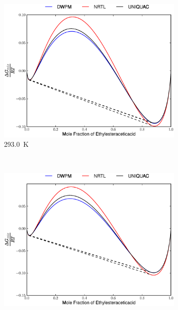 \vspace*{\fill}
\clearpage
\vspace*{\fill}
\begin{figure}[hp]
\ContinuedFloat 
\begin{subfigure}[h]{0.5\textwidth}
	\centering
	\includegraphics[width = \textwidth]{Results_Parts/BinaryParams/ethylesteraceticacid-water/AllModelsGibbsPlots/T_293.0.eps}
	\caption{293.0~$\mathrm{K}$}
\end{subfigure}%
~%
\begin{subfigure}[h]{0.5\textwidth}
	\centering
	\includegraphics[width = \textwidth]{Results_Parts/BinaryParams/ethylesteraceticacid-water/AllModelsGibbsPlots/T_298.0.eps}

\end{subfigure}
\end{figure}
